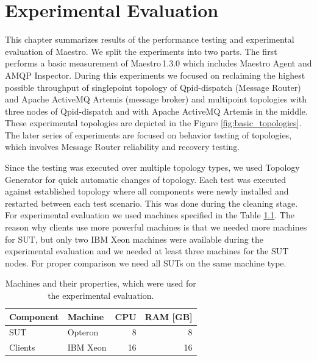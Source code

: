 
\chapter{Experimental Evaluation}
\label{Experimental Evaluation}
This chapter summarizes results of the performance testing and experimental evaluation of Maestro. We split the experiments into two parts. The first performs a basic measurement of Maestro\,1.3.0 which includes Maestro Agent and AMQP Inspector. During this experiments we focused on reclaiming the highest possible throughput of singlepoint topology of Qpid-dispatch (Message Router) and Apache ActiveMQ Artemis (message broker) and multipoint topologies with three nodes of Qpid-dispatch and with Apache ActiveMQ Artemis in the middle. These experimental topologies are depicted in the Figure \ref{fig:basic_topologies}. The later series of experiments are focused on behavior testing of topologies, which involves Message Router reliability and recovery testing.

Since the testing was executed over multiple topology types, we used Topology Generator for quick automatic changes of topology. Each test was executed against established topology where all components were newly installed and restarted between each test scenario. This was done during the cleaning stage. For experimental evaluation we used machines specified in the Table \ref{tab:machines}. The reason why clients use more powerful machines is that we needed more machines for SUT, but only two IBM Xeon machines were available during the experimental evaluation and we needed at least three machines for the SUT nodes. For proper comparison we need all SUTs on the same machine type.

\begingroup
\setlength{\tabcolsep}{10pt} %
\renewcommand{\arraystretch}{1.35} %
	\begin{table}[H]
	\centering
	\begin{tabular}{|l|l|r|r|}
	\hline
	\rowcolor[HTML]{C5E3DF}
	\textbf{Component} & \textbf{Machine} & \textbf{CPU} & \textbf{RAM [GB]} \\ \hline
	SUT & Opteron & 8 & 8 \\ \hline
	Clients & IBM Xeon & 16 & 16 \\ \hline
	\end{tabular}
	\caption{Machines and their properties, which were used for the experimental evaluation.}
	\label{tab:machines}
	\end{table}
\endgroup

